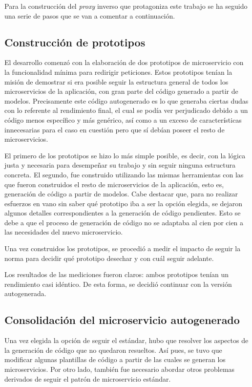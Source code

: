 \documentclass[11pt,spanish,listoffigures]{tfgetsinf}
\begin{document}
Para la construcción del \emph{proxy} inverso que protagoniza este trabajo se ha seguido una serie de pasos que se van a comentar a continuación.

\subsection{Construcción de prototipos}

El desarrollo comenzó con la elaboración de dos prototipos de microservicio con la funcionalidad mínima para redirigir peticiones. Estos prototipos tenían la misión de demostrar si era posible seguir la estructura general de todos los microservicios de la aplicación, con gran parte del código generado a partir de modelos. Precisamente este código autogenerado es lo que generaba ciertas dudas con lo referente al rendimiento final, el cual se podía ver perjudicado debido a un código menos específico y más genérico, así como a un exceso de características innecesarias para el caso en cuestión pero que sí debían poseer el resto de microservicios.

El primero de los prototipos se hizo lo más simple posible, es decir, con la lógica justa y necesaria para desempeñar su trabajo y sin seguir ninguna estructura concreta. El segundo, fue construido utilizando las mismas herramientas con las que fueron construidos el resto de microservicios de la aplicación, esto es, generación de código a partir de modelos. Cabe destacar que, para no realizar esfuerzos en vano sin saber qué prototipo iba a ser la opción elegida, se dejaron algunos detalles correspondientes a la generación de código pendientes. Esto se debe a que el proceso de generación de código no se adaptaba al cien por cien a las necesidades del nuevo microservicio.

Una vez construidos los prototipos, se procedió a medir el impacto de seguir la norma para decidir qué prototipo desechar y con cuál seguir adelante.

Los resultados de las mediciones fueron claros: ambos prototipos tenían un rendimiento casi idéntico. De esta forma, se decidió continuar con la versión autogenerada.

\subsection{Consolidación del microservicio autogenerado}

Una vez elegida la opción de seguir el estándar, hubo que resolver los aspectos de la generación de código que no quedaron resueltos. Así pues, se tuvo que modificar algunas plantillas de código a partir de las cuales se generan los microservicios. Por otro lado, también fue necesario abordar otros problemas derivados de seguir el patrón de microservicio estándar.
\end{document}
